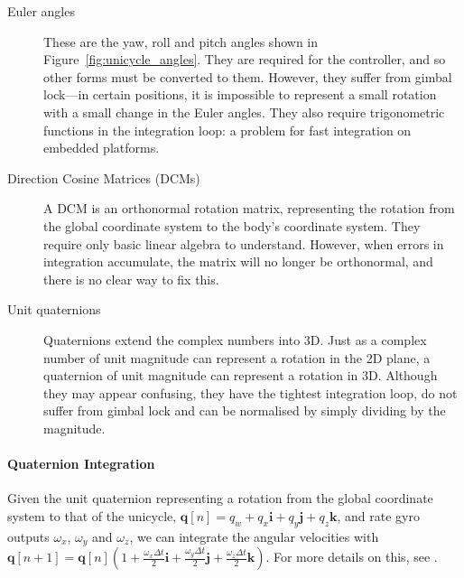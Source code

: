 \documentclass{IIBproject}
\begin{document}
\begin{description}
  \item[Euler angles]
    These are the yaw, roll and pitch angles shown in
    Figure~\ref{fig:unicycle_angles}. They are required for the controller,
    and so other forms must be converted to them. However, they suffer from
    gimbal lock---in certain positions, it is impossible to represent a
    small rotation with a small change in the Euler angles. They also require
    trigonometric functions in the integration loop: a problem for fast
    integration on embedded platforms.

  \item[Direction Cosine Matrices (DCMs)]
    A DCM is an orthonormal rotation matrix, representing the rotation from
    the global coordinate system to the body's coordinate system. They require
    only basic linear algebra to understand. However, when errors in
    integration accumulate, the matrix will no longer be orthonormal, and
    there is no clear way to fix this.

  \item[Unit quaternions]
    Quaternions extend the complex numbers into 3D. Just as a complex number
    of unit magnitude can represent a rotation in the 2D plane, a quaternion
    of unit magnitude can represent a rotation in 3D. Although they may appear
    confusing, they have the tightest integration loop, do not suffer from
    gimbal lock and can be normalised by simply dividing by the magnitude.

    \end{description}


\paragraph{Quaternion Integration}
Given the unit quaternion representing a rotation from the global coordinate
system to that of the unicycle, $\boldsymbol{q}[n] = q_w + q_x
\boldsymbol{i} + q_y \boldsymbol{j} + q_z \boldsymbol{k}$, and rate gyro
outputs $\omega_x$, $\omega_y$ and $\omega_z$, we can integrate
the angular velocities with $\boldsymbol{q}[n+1] = \boldsymbol{q}[n] \left(1 +
\frac{\omega_x \Delta t}{2} \boldsymbol{i} + 
\frac{\omega_y \Delta t}{2} \boldsymbol{j} + 
\frac{\omega_z \Delta t}{2} \boldsymbol{k}\right)$. For more details on this,
see \cite{ref:quaternions}.
\end{document}
